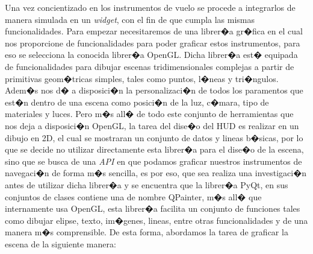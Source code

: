\par Una vez concientizado en los instrumentos de vuelo se procede a integrarlos de manera simulada en un \textit{widget}, con el fin de que cumpla las mismas funcionalidades. Para empezar necesitaremos de una librer�a gr�fica en el cual nos proporcione de funcionalidades para poder graficar estos instrumentos, para eso se selecciona la conocida librer�a OpenGL. Dicha librer�a est� equipada de funcionalidades para dibujar escenas tridimensionales complejas a partir de primitivas geom�tricas simples, tales como puntos, l�neas y tri�ngulos. Adem�s nos d� a disposici�n la personalizaci�n de todos los paramentos que est�n dentro de una escena como posici�n de la luz, c�mara,  tipo de materiales y luces. Pero m�s all� de todo este conjunto de herramientas que nos deja a disposici�n OpenGL, la tarea del dise�o del HUD es realizar en un dibujo en 2D,  el cual se mostraran un conjunto de datos y lineas b�sicas, por lo que se decide no utilizar directamente esta librer�a para el dise�o de la escena, sino que se busca de una \textit{API} en que podamos graficar nuestros instrumentos de navegaci�n de forma m�s sencilla, es por eso, que sea realiza una investigaci�n antes de utilizar dicha librer�a y se encuentra que la librer�a PyQt, en sus conjuntos de clases contiene una de nombre QPainter, m�s all� que internamente usa OpenGL, esta librer�a facilita un conjunto de funciones tales como dibujar elipse, texto, im�genes, lineas, entre otras funcionalidades y de una manera m�s comprensible. De esta forma, abordamos la tarea de graficar  la escena de la siguiente manera: \newline

